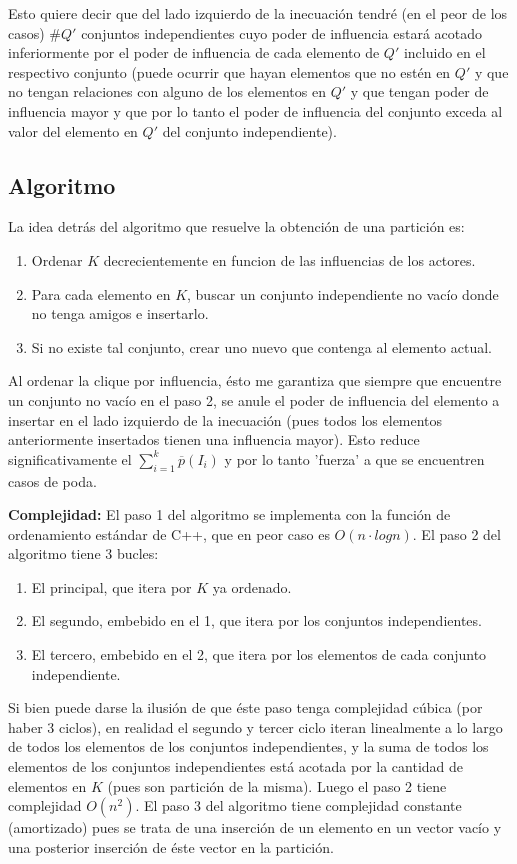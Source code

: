 \documentclass[10pt, a4paper]{article}
\begin{document}
Esto quiere decir que del lado izquierdo de la inecuaci\'on tendr\'e (en el peor de los casos) $\#Q'$ conjuntos independientes cuyo poder de influencia estar\'a acotado inferiormente por el poder de influencia de cada elemento de $Q'$ incluido en el respectivo conjunto (puede ocurrir que hayan elementos que no est\'en en $Q'$ y que no tengan relaciones con alguno de los elementos en $Q'$ y que tengan poder de influencia mayor y que por lo tanto el poder de influencia del conjunto exceda al valor del elemento en $Q'$ del conjunto independiente).

\subsection{Algoritmo}
La idea detr\'as del algoritmo que resuelve la obtenci\'on de una partici\'on es:
\begin{enumerate}
    \item Ordenar $K$ decrecientemente en funcion de las influencias de los actores.
    \item Para cada elemento en $K$, buscar un conjunto independiente no vac\'io donde no tenga amigos e insertarlo.
    \item Si no existe tal conjunto, crear uno nuevo que contenga al elemento actual.
\end{enumerate}

Al ordenar la clique por influencia, \'esto me garantiza que siempre que encuentre un conjunto no vac\'io en el paso 2, se anule el poder de influencia del elemento a insertar en el lado izquierdo de la inecuaci\'on (pues todos los elementos anteriormente insertados tienen una influencia mayor). Esto reduce significativamente el $\sum_{i=1}^{k} \overline{p}(I_i)$ y por lo tanto 'fuerza' a que se encuentren casos de poda.

\textbf{Complejidad: } El paso 1 del algoritmo se implementa con la funci\'on de ordenamiento est\'andar de C++, que en peor caso es $O(n \cdot log n)$.
El paso 2 del algoritmo tiene 3 bucles:
\begin{enumerate}
    \item El principal, que itera por $K$ ya ordenado.
    \item El segundo, embebido en el 1, que itera por los conjuntos independientes.
    \item El tercero, embebido en el 2, que itera por los elementos de cada conjunto independiente.
\end{enumerate}
Si bien puede darse la ilusi\'on de que \'este paso tenga complejidad c\'ubica (por haber 3 ciclos), en realidad el segundo y tercer ciclo iteran linealmente a lo largo de todos los elementos de los conjuntos independientes, y la suma de todos los elementos de los conjuntos independientes est\'a acotada por la cantidad de elementos en $K$ (pues son partici\'on de la misma). Luego el paso 2 tiene complejidad $O(n^2)$.
El paso 3 del algoritmo tiene complejidad constante (amortizado) pues se trata de una inserci\'on de un elemento en un vector vac\'io y una posterior inserci\'on de \'este vector en la partici\'on. \\
\end{document}
